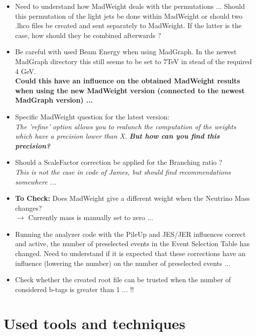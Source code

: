 \documentclass[a4paper,12pt]{report}
\begin{document}
\begin{itemize}
  \item Need to understand how MadWeight deals with the permutations ... Should this permutation of the light jets be done within MadWeight or should two .lhco files be created and sent separately to MadWeight. If the latter is the case, how should they be combined afterwards ?
  \item Be careful with used Beam Energy when using MadGraph. In the newest MadGraph directory this still seems to be set to 7TeV in stead of the required 4 GeV. \\ \textbf{Could this have an influence on the obtained MadWeight results when using the new MadWeight version (connected to the newest MadGraph version) ...}
  \item Specific MadWeight question for the latest version: \\ \textit{The 'refine' option allows you to realunch the computation of the weights which have a precision lower than X. \textbf{But how can you find this precision?}}
  \item Should a ScaleFactor correction be applied for the Branching ratio ? \\ \textit{This is not the case in code of James, but should find recommendations somewhere ...}
  \item \textbf{To Check:} Does MadWeight give a different weight when the Neutrino Mass changes?\\ $\rightarrow$ Currently mass is manually set to zero ...
  \item Running the analyzer code with the PileUp and JES/JER influences correct and active, the number of preselected events in the Event Selection Table has changed. Need to understand if it is expected that these corrections have an influence (lowering the number) on the number of preselected events ...
  \item Check whether the created root file can be trusted when the number of considered b-tags is greater than 1 ... !!
\end{itemize}

\chapter{Used tools and techniques}
\end{document}

